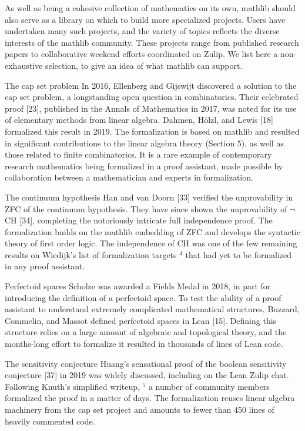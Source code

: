 \documentclass[
]{article}
\begin{document}
As well as being a cohesive collection of mathematics on its own,
mathlib should also serve as a library on which to build more
specialized projects. Users have undertaken many such projects, and the
variety of topics reflects the diverse interests of the mathlib
community. These projects range from published research papers to
collaborative weekend efforts coordinated on Zulip. We list here a
non-exhaustive selection, to give an idea of what mathlib can support.

The cap set problem In 2016, Ellenberg and Gijswijt discovered a
solution to the cap set problem, a longstanding open question in
combinatorics. Their celebrated proof {[}23{]}, published in the Annals
of Mathematics in 2017, was noted for its use of elementary methods from
linear algebra. Dahmen, Hölzl, and Lewis {[}18{]} formalized this result
in 2019. The formalization is based on mathlib and resulted in
significant contributions to the linear algebra theory (Section 5), as
well as those related to finite combinatorics. It is a rare example of
contemporary research mathematics being formalized in a proof assistant,
made possible by collaboration between a mathematician and experts in
formalization.

The continuum hypothesis Han and van Doorn {[}33{]} verified the
unprovability in ZFC of the continuum hypothesis. They have since shown
the unprovability of \(\neg\) CH {[}34{]}, completing the notoriously
intricate full independence proof. The formalization builds on the
mathlib embedding of ZFC and develops the syntactic theory of first
order logic. The independence of CH was one of the few remaining results
on Wiedijk's list of formalization targets \(^{4}\) that had yet to be
formalized in any proof assistant.

Perfectoid spaces Scholze was awarded a Fields Medal in 2018, in part
for introducing the definition of a perfectoid space. To test the
ability of a proof assistant to understand extremely complicated
mathematical structures, Buzzard, Commelin, and Massot defined
perfectoid spaces in Lean {[}15{]}. Defining this structure relies on a
large amount of algebraic and topological theory, and the months-long
effort to formalize it resulted in thousands of lines of Lean code.

The sensitivity conjecture Huang's sensational proof of the boolean
sensitivity conjecture {[}37{]} in 2019 was widely discussed, including
on the Lean Zulip chat. Following Knuth's simplified writeup, \(^{5}\) a
number of community members formalized the proof in a matter of days.
The formalization reuses linear algebra machinery from the cap set
project and amounts to fewer than 450 lines of heavily commented code.
\end{document}
